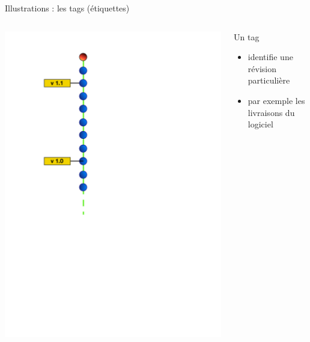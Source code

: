 \begin{frame}{%
\protect\hypertarget{illustrations-les-tags-uxe9tiquettes}{%
Illustrations : les tags (étiquettes)}}

\begin{columns}[T]
\begin{column}{0.40\textwidth}
\includegraphics[height=1.5\textwidth]{images/tags.pdf}
\end{column}

\begin{column}{0.60\textwidth}
Un tag

\begin{itemize}
\tightlist
\item
  identifie une révision particulière
\item
  par exemple les livraisons du logiciel
\end{itemize}
\end{column}
\end{columns}

\end{frame}

